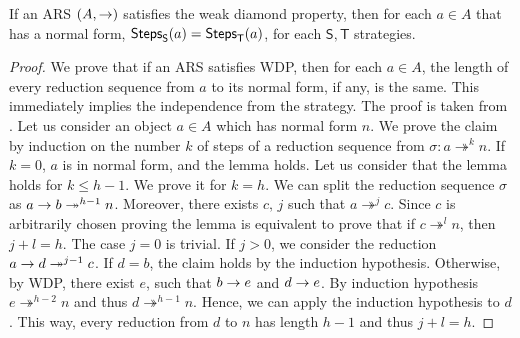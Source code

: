 \begin{lemma}[]\label{lemma:weak}
	If an ARS $(A,\rightarrow)$ satisfies the weak diamond property, then for each $a\in A$ that has a normal form, $\textsf{Steps}_{\mathsf{S}}(a)=\textsf{Steps}_{\mathsf{T}}(a)$, for each $\mathsf{S},\mathsf{T}$ strategies.
\end{lemma}
\begin{proof}
	We prove that if an ARS satisfies WDP, then for each $a\in A$, the length of every reduction sequence from $a$ to its normal form, if any, is the same. This immediately implies the independence from the strategy. The proof is taken from \cite{zantema_strategy_2012}.
	Let us consider an object $a\in A$ which has normal form $n$. We prove the claim by induction on the number $k$ of steps of a reduction sequence from $\sigma:a\twoheadrightarrow^k n$. If $k=0$, $a$ is in normal form, and the lemma holds. Let us consider that the lemma holds for $k\leq h-1$. We prove it for $k=h$. We can split the reduction sequence $\sigma$ as $a\rightarrow b\twoheadrightarrow^{h-1} n$. Moreover, there exists $c,\,j$ such that $a\twoheadrightarrow^j c$. Since $c$ is arbitrarily chosen proving the lemma is equivalent to prove that if $c\twoheadrightarrow^l n$, then $j+l=h$. The case $j=0$ is trivial. If $j>0$, we consider the reduction $a\rightarrow d\twoheadrightarrow^{j-1}c$. If $d=b$, the claim holds by the induction hypothesis. Otherwise, by WDP, there exist $e$, such that $b\rightarrow e$ and $d\rightarrow e$. By induction hypothesis $e\twoheadrightarrow^{h-2} n$ and thus $d\twoheadrightarrow^{h-1}n$. Hence, we can apply the induction hypothesis to $d$. This way, every reduction from $d$ to $n$ has length $h-1$ and thus $j+l=h$.
\end{proof}
